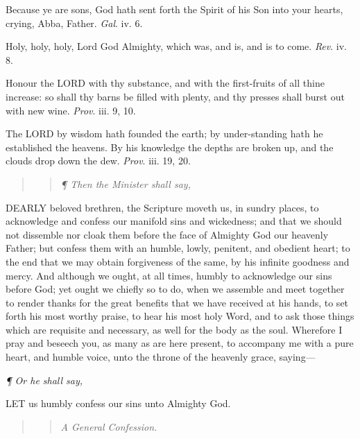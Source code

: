 Because ye are sons, God hath sent forth the Spirit
of his Son into your hearts, crying, Abba, Father. \emph{Gal}.
iv. 6.

Holy, holy, holy, Lord God Almighty, which was, and is, and is to come.
\emph{Rev}. iv. 8.

Honour the LORD with thy substance, and with the
first-fruits of all thine increase: so shall thy barns be filled with
plenty, and thy presses shall burst out with new wine. \emph{Prov}.
iii. 9, 10.

The
LORD by wisdom hath founded the earth; by under-standing
hath he established the heavens. By his knowledge the depths are broken
up, and the clouds drop down the dew. \emph{Prov}. iii. 19, 20.

\begin{quote}

\begin{quote}

\emph{¶
Then the Minister shall say,}

\end{quote}

\end{quote}

DEARLY
beloved brethren, the Scripture moveth us, in sundry places, to acknowledge
and confess our manifold sins and wickedness; and that we should not dissemble
nor cloak them before the face of Almighty God our heavenly Father; but
confess them with an humble, lowly, penitent, and obedient heart; to the
end that we may obtain forgiveness of the same, by his infinite goodness
and mercy. And although we ought, at all times, humbly to acknowledge
our sins before God; yet ought we chiefly so to do, when we assemble and
meet together to render thanks for the great benefits that we have received
at his hands, to set forth his most worthy praise, to hear his most holy
Word, and to ask those things which are requisite and necessary, as well
for the body as the soul. Wherefore I pray and beseech you, as many as
are here present, to accompany me with a pure heart, and humble voice,
unto the throne of the heavenly grace, saying—

\emph{¶
Or he shall say,}

LET us humbly confess
our sins unto Almighty God.

\begin{quote}

\begin{quote}

\emph{A
General Confession.}

\end{quote}

\end{quote}

